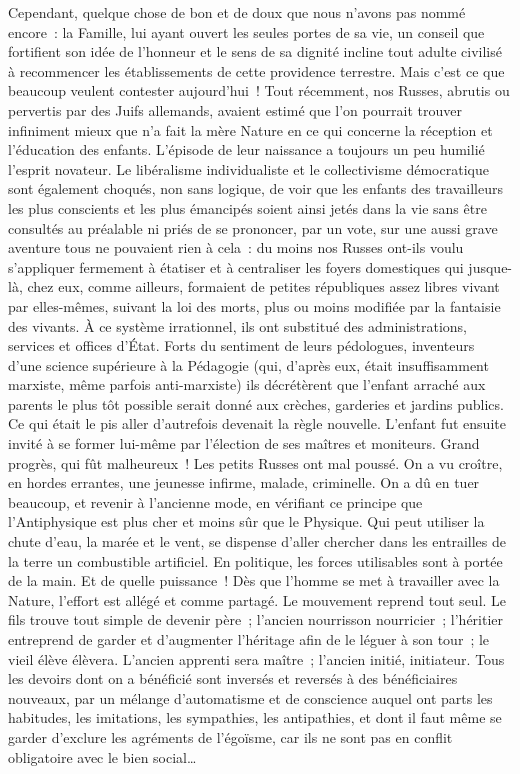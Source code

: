 \documentclass[french,twoside]{book} %
\begin{document}
Cependant, quelque chose de bon et de doux que nous n’avons pas nommé encore : la Famille, lui ayant ouvert les seules portes de sa vie, un conseil que fortifient son idée de l’honneur et le sens de sa dignité incline tout adulte civilisé à recommencer les établissements de cette providence terrestre. Mais c’est ce que beaucoup veulent contester aujourd’hui ! Tout récemment, nos Russes, abrutis ou pervertis par des Juifs allemands, avaient estimé que l’on pourrait trouver infiniment mieux que n’a fait la mère Nature en ce qui concerne la réception et l’éducation des enfants. L’épisode de leur naissance a toujours un peu humilié l’esprit novateur. Le libéralisme individualiste et le collectivisme démocratique sont également choqués, non sans logique, de voir que les enfants des travailleurs les plus conscients et les plus émancipés soient ainsi jetés dans la vie sans être consultés au préalable ni priés de se prononcer, par un vote, sur une aussi grave aventure tous ne pouvaient rien à cela : du moins nos Russes ont-ils voulu s’appliquer fermement à étatiser et à centraliser les foyers domestiques qui jusque-là, chez eux, comme ailleurs, formaient de petites républiques assez libres vivant par elles-mêmes, suivant la loi des morts, plus ou moins modifiée par la fantaisie des vivants. À ce système irrationnel, ils ont substitué des administrations, services et offices d’État. Forts du sentiment de leurs pédologues, inventeurs d’une science supérieure à la Pédagogie (qui, d’après eux, était insuffisamment marxiste, même parfois anti-marxiste) ils décrétèrent que l’enfant arraché aux parents le plus tôt possible serait donné aux crèches, garderies et jardins publics. Ce qui était le pis aller d’autrefois devenait la règle nouvelle. L’enfant fut ensuite invité à se former lui-même par l’élection de ses maîtres et moniteurs. Grand progrès, qui fût malheureux ! Les petits Russes ont mal poussé. On a vu croître, en hordes errantes, une jeunesse infirme, malade, criminelle. On a dû en tuer beaucoup, et revenir à l’ancienne mode, en vérifiant ce principe que l’Antiphysique est plus cher et moins sûr que le Physique. Qui peut utiliser la chute d’eau, la marée et le vent, se dispense d’aller chercher dans les entrailles de la terre un combustible artificiel. En politique, les forces utilisables sont à portée de la main. Et de quelle puissance ! Dès que l’homme se met à travailler avec la Nature, l’effort est allégé et comme partagé. Le mouvement reprend tout seul. Le fils trouve tout simple de devenir père ; l’ancien nourrisson nourricier ; l’héritier entreprend de garder et d’augmenter l’héritage afin de le léguer à son tour ; le vieil élève élèvera. L’ancien apprenti sera maître ; l’ancien initié, initiateur. Tous les devoirs dont on a bénéficié sont inversés et reversés à des bénéficiaires nouveaux, par un mélange d’automatisme et de conscience auquel ont parts les habitudes, les imitations, les sympathies, les antipathies, et dont il faut même se garder d’exclure les agréments de l’égoïsme, car ils ne sont pas en conflit obligatoire avec le bien social…\par
\end{document}
